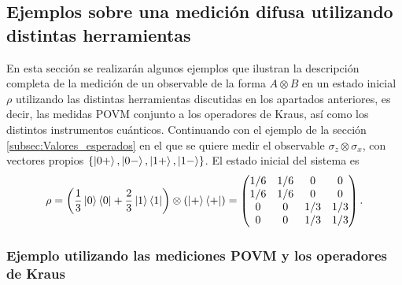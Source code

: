 \subsection{Ejemplos sobre una medición difusa utilizando distintas herramientas} %


En esta sección se realizarán algunos ejemplos que ilustran la descripción completa de la medición de un observable de la forma $A\otimes B$ en un estado inicial $\rho$ utilizando las distintas herramientas discutidas en los apartados anteriores, es decir, las medidas POVM conjunto a los operadores de Kraus, así como los distintos instrumentos cuánticos. Continuando con el ejemplo de la sección {\ref{subsec:Valores_esperados}} en el que se quiere medir el observable $\sigma_z\otimes \sigma_x$, con vectores propios $\{\ket{0+},\ket{0-},\ket{1+},\ket{1-}\}$. El estado inicial del sistema es  \begin{equation}\label{eq:estado-ejemplos-2p}\rho= \left(\frac{1}{3}\ket{0}\bra{0}+\frac{2}{3}\ket{1}\bra{1}\right)\otimes\left(\ket{+}\bra{+}\right)=\begin{pmatrix}
    1/6&1/6&0&0\\
    1/6&1/6&0&0\\
    0&0&1/3&1/3\\
    0&0&1/3&1/3\\
\end{pmatrix}.\end{equation}


\subsubsection{Ejemplo utilizando las mediciones POVM y los operadores de Kraus} %


